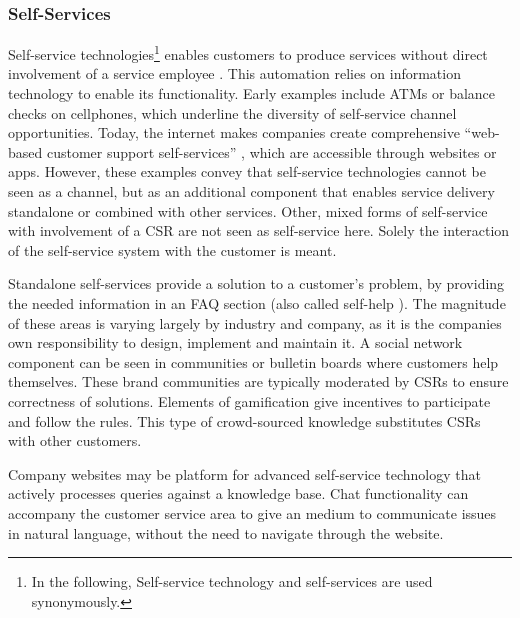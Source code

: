	\subsubsection{Self-Services}
	\label{sec:ss}
		Self-service technologies\footnote{In the following, Self-service technology and self-services are used synonymously.} enables customers to produce services without direct involvement of a service employee \citep{meuter2000self}. This automation relies on information technology to enable its functionality. Early examples include ATMs or balance checks on cellphones, which underline the diversity of self-service channel opportunities. Today, the internet makes companies create comprehensive \enquote{web-based customer support self-services} \citep{Thomas:2009}, which are accessible through websites or apps. However, these examples convey that self-service technologies cannot be seen as a channel, but as an additional component that enables service delivery standalone or combined with other services. Other, mixed forms of self-service with involvement of a \acrshort{CSR} \citep{Globerson_1991}  are not seen as self-service here. Solely the interaction of the self-service system with the customer is meant.
		
		Standalone self-services provide a solution to a customer's problem, \ie by providing the needed information in an \acrshort{FAQ} section (also called self-help \citep{meuter2000self}). The magnitude of these areas is varying largely by industry and company, as it is the companies own responsibility to design, implement and maintain it. A social network component can be seen in communities or bulletin boards \citep{Thomas:2009} where customers help themselves. These brand communities \citep{Hsieh_2017} are typically moderated by \acrshort{CSR}s to ensure correctness of solutions. Elements of gamification give incentives to participate and follow the rules. This type of crowd-sourced knowledge substitutes \acrshort{CSR}s with other customers.
		
		Company websites may be platform for advanced self-service technology that actively processes queries against a knowledge base. Chat functionality can accompany the customer service area to give an medium to communicate issues in natural language, without the need to navigate through the website. 
		
		

